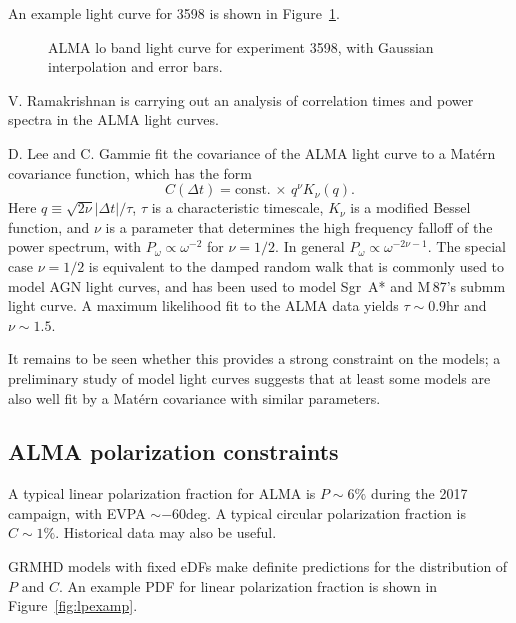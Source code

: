 \documentclass[twocolumn,tighten,dvipsnames]{aastex63}
\newcommand\sgra{Sgr~A*\xspace}
\def\M87{M\,87\xspace}
\newcommand\Rh{R_\mathrm{high}}
\newcommand\<{{\langle}}
\renewcommand\>{{\rangle}} %
\begin{document}
An example light curve for 3598 is shown in Figure~\ref{fig:LC3598}.

\begin{figure}
  \caption{ALMA lo band light curve for experiment 3598, with Gaussian interpolation and error bars.}
  \label{fig:LC3598}
\end{figure}

V. Ramakrishnan is carrying out an analysis of correlation times and power spectra in the ALMA light curves.

D. Lee and C. Gammie fit the covariance of the ALMA light curve to a Mat\'ern covariance function, which has the form
\begin{equation}
  C(\Delta t) = \mbox{const.} \, \times \, q^\nu K_\nu(q).
\end{equation}
Here $q \equiv \sqrt{2\nu} |\Delta t|/\tau$, $\tau$ is a characteristic timescale, $K_\nu$ is a modified Bessel function, and $\nu$ is a parameter that determines the high frequency falloff of the power spectrum, with $P_\omega \propto \omega^{-2}$ for $\nu = 1/2$.  In general $P_\omega \propto \omega^{-2\nu - 1}$. The special case $\nu = 1/2$ is equivalent to the damped random walk that is commonly used to model AGN light curves, and has been used to model \sgra and \M87's submm light curve. A maximum likelihood fit to the ALMA data yields $\tau \sim 0.9$hr and $\nu \sim 1.5$.

It remains to be seen whether this provides a strong constraint on the models; a preliminary study of model light curves suggests that at least some models are also well fit by a Mat\'ern covariance with similar parameters.

\subsection{ALMA polarization constraints}
\label{sec:polconst}

A typical linear polarization fraction for ALMA is $P \sim 6\%$ during the 2017 campaign, with EVPA $\sim -60$deg.  A typical circular polarization fraction is $C \sim 1\%$.  Historical data may also be useful.

GRMHD models with fixed eDFs make definite predictions for the distribution of $P$ and $C$.  An example PDF for linear polarization fraction is shown in Figure~\ref{fig:lpexamp}.

\begin{figure*}
  \caption{Left: distribution of linear polarization fraction from a MAD model with $a = 0$, $i = 30$deg, $\Rh = 10$. Right: distribution of circular polarization fraction for the same model.}
  \label{fig:lpexamp}
\end{figure*}
\end{document}
